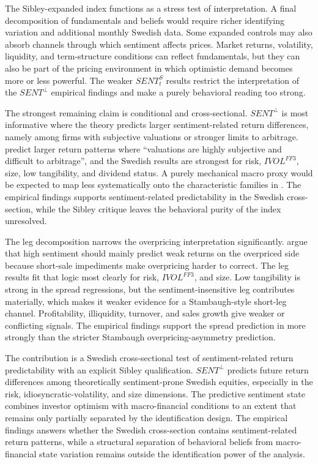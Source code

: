 \documentclass[11pt]{article}
\newcommand{\var}[1]{\ensuremath{#1}}
\begin{document}
The Sibley-expanded index functions as a stress test of interpretation. A final decomposition of fundamentals and beliefs would require richer identifying variation and additional monthly Swedish data. Some expanded controls may also absorb channels through which sentiment affects prices. Market returns, volatility, liquidity, and term-structure conditions can reflect fundamentals, but they can also be part of the pricing environment in which optimistic demand becomes more or less powerful. The weaker \var{SENT^{S}_{t}} results restrict the interpretation of the \var{SENT^{\perp}} empirical findings and make a purely behavioral reading too strong.

The strongest remaining claim is conditional and cross-sectional. \var{SENT^{\perp}} is most informative where the theory predicts larger sentiment-related return differences, namely among firms with subjective valuations or stronger limits to arbitrage. \citet{baker2006sentiment} predict larger return patterns where \enquote{valuations are highly subjective and difficult to arbitrage}, and the Swedish results are strongest for risk, \var{IVOL^{FF3}}, size, low tangibility, and dividend status. A purely mechanical macro proxy would be expected to map less systematically onto the characteristic families in \citet{baker2006sentiment}. The empirical findings supports sentiment-related predictability in the Swedish cross-section, while the Sibley critique leaves the behavioral purity of the index unresolved.

The leg decomposition narrows the overpricing interpretation significantly. \citet{stambaugh2012short} argue that high sentiment should mainly predict weak returns on the overpriced side because short-sale impediments make overpricing harder to correct. The leg results fit that logic most clearly for risk, \var{IVOL^{FF3}}, and size. Low tangibility is strong in the spread regressions, but the sentiment-insensitive leg contributes materially, which makes it weaker evidence for a Stambaugh-style short-leg channel. Profitability, illiquidity, turnover, and sales growth give weaker or conflicting signals. The empirical findings support the spread prediction in \citet{baker2006sentiment} more strongly than the stricter Stambaugh overpricing-asymmetry prediction.

The contribution is a Swedish cross-sectional test of sentiment-related return predictability with an explicit Sibley qualification. \var{SENT^{\perp}} predicts future return differences among theoretically sentiment-prone Swedish equities, especially in the risk, idiosyncratic-volatility, and size dimensions. The predictive sentiment state combines investor optimism with macro-financial conditions to an extent that remains only partially separated by the identification design. The empirical findings answers whether the Swedish cross-section contains sentiment-related return patterns, while a structural separation of behavioral beliefs from macro-financial state variation remains outside the identification power of the analysis.
\end{document}
